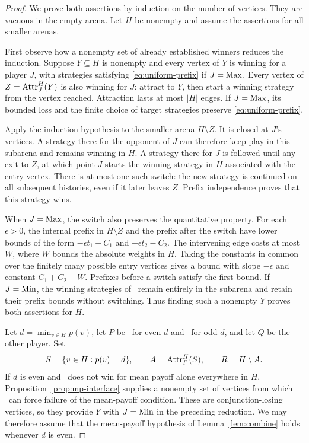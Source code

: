\begin{proof}
We prove both assertions by induction on the number of vertices.  They
are vacuous in the empty arena.  Let $H$ be nonempty and assume the
assertions for all smaller arenas.

First observe how a nonempty set of already established winners reduces
the induction.  Suppose $Y\subseteq H$ is nonempty and every vertex of
$Y$ is winning for a player $J$, with strategies satisfying
\eqref{eq:uniform-prefix} if $J=\mathrm{Max}$.  Every vertex of
$Z=\operatorname{Attr}_J^H(Y)$ is also winning for $J$: attract to $Y$, then start a
winning strategy from the vertex reached.  Attraction lasts at most
$|H|$ edges.  If $J=\mathrm{Max}$, its bounded loss and the finite choice of
target strategies preserve \eqref{eq:uniform-prefix}.

Apply the induction hypothesis to the smaller arena $H\setminus Z$.
It is closed at $J$'s vertices.  A strategy there for the opponent of
$J$ can therefore keep play in this subarena and remains winning in
$H$.  A strategy there for $J$ is followed until any exit to $Z$, at
which point $J$ starts the winning strategy in $H$ associated with the
entry vertex.  There is at most one such switch: the new strategy is
continued on all subsequent histories, even if it later leaves $Z$.
Prefix independence proves that this strategy wins.

When $J=\mathrm{Max}$, the switch also preserves the quantitative property.
For each $\epsilon>0$, the internal prefix in $H\setminus Z$ and the
prefix after the switch have lower bounds of the form
$-\epsilon t_1-C_1$ and $-\epsilon t_2-C_2$.  The intervening edge costs
at most $W$, where $W$ bounds the absolute weights in $H$.  Taking the
constants in common over the finitely many possible entry vertices
gives a bound with slope $-\epsilon$ and constant $C_1+C_2+W$.
Prefixes before a switch satisfy the first bound.  If $J=\mathrm{Min}$, the
winning strategies of \Max\ remain entirely in the subarena and retain
their prefix bounds without switching.  Thus finding such a nonempty
$Y$ proves both assertions for $H$.

Let $d=\min_{v\in H}p(v)$, let $P$ be \Max\ for even $d$ and \Min\
for odd $d$, and let $Q$ be the other player.  Set
\[
 S=\{v\in H:p(v)=d\},\qquad
 A=\operatorname{Attr}_P^H(S),\qquad R=H\setminus A.
\]
If $d$ is even and \Max\ does not win for mean payoff alone everywhere
in $H$, Proposition~\ref{prop:mp-interface} supplies a nonempty set of
vertices from which \Min\ can force failure of the mean-payoff
condition.  These are conjunction-losing vertices, so they provide
$Y$ with $J=\mathrm{Min}$ in the preceding reduction.  We may therefore assume
that the mean-payoff hypothesis of Lemma~\ref{lem:combine} holds whenever
$d$ is even.


\end{proof}
